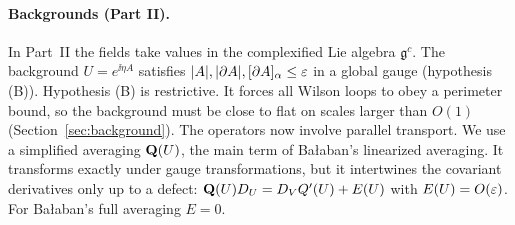 \paragraph{Backgrounds (Part II).} In Part~II the fields take values in the complexified Lie algebra $\mathfrak g^c$. The background $U=e^{\ii\eta A}$ satisfies $|A|,|\partial A|,[\partial A]_\alpha\le\varepsilon$ in a global gauge (hypothesis (B)). Hypothesis (B) is restrictive. It forces all Wilson loops to obey a perimeter bound, so the background must be close to flat on scales larger than $O(1)$ (Section~\ref{sec:background}). The operators now involve parallel transport. We use a simplified averaging $\mathbf Q(U)$, the main term of Ba\l aban's linearized averaging. It transforms exactly under gauge transformations, but it intertwines the covariant derivatives only up to a defect: $\mathbf Q(U)D_U=D_VQ'(U)+E(U)$ with $E(U)=O(\varepsilon)$. For Ba\l aban's full averaging $E=0$.

